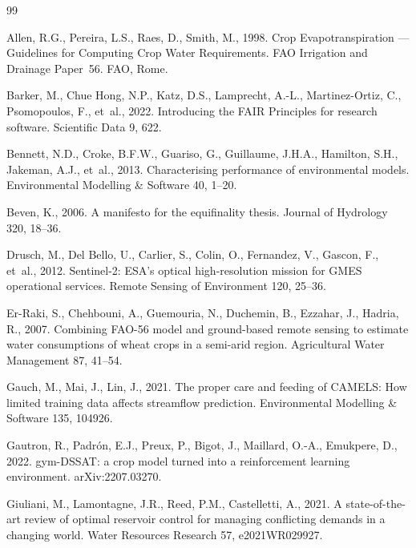 \documentclass[preprint,12pt,authoryear,review]{elsarticle}
\begin{document}
\begin{thebibliography}{99}

Allen, R.G., Pereira, L.S., Raes, D., Smith, M., 1998. Crop Evapotranspiration --- Guidelines for Computing Crop Water Requirements. FAO Irrigation and Drainage Paper~56. FAO, Rome.

Barker, M., Chue Hong, N.P., Katz, D.S., Lamprecht, A.-L., Martinez-Ortiz, C., Psomopoulos, F., et~al., 2022. Introducing the FAIR Principles for research software. Scientific Data 9, 622. 

Bennett, N.D., Croke, B.F.W., Guariso, G., Guillaume, J.H.A., Hamilton, S.H., Jakeman, A.J., et~al., 2013. Characterising performance of environmental models. Environmental Modelling \& Software 40, 1--20. 

Beven, K., 2006. A manifesto for the equifinality thesis. Journal of Hydrology 320, 18--36. 

Drusch, M., Del Bello, U., Carlier, S., Colin, O., Fernandez, V., Gascon, F., et~al., 2012. Sentinel-2: ESA's optical high-resolution mission for GMES operational services. Remote Sensing of Environment 120, 25--36. 

Er-Raki, S., Chehbouni, A., Guemouria, N., Duchemin, B., Ezzahar, J., Hadria, R., 2007. Combining FAO-56 model and ground-based remote sensing to estimate water consumptions of wheat crops in a semi-arid region. Agricultural Water Management 87, 41--54. 

Gauch, M., Mai, J., Lin, J., 2021. The proper care and feeding of CAMELS: How limited training data affects streamflow prediction. Environmental Modelling \& Software 135, 104926. 

Gautron, R., Padr\'on, E.J., Preux, P., Bigot, J., Maillard, O.-A., Emukpere, D., 2022. gym-DSSAT: a crop model turned into a reinforcement learning environment. arXiv:2207.03270.

Giuliani, M., Lamontagne, J.R., Reed, P.M., Castelletti, A., 2021. A state-of-the-art review of optimal reservoir control for managing conflicting demands in a changing world. Water Resources Research 57, e2021WR029927. 


\end{thebibliography}
\end{document}
